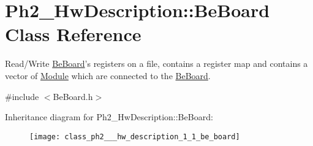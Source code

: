 \hypertarget{class_ph2___hw_description_1_1_be_board}{\section{Ph2\-\_\-\-Hw\-Description\-:\-:Be\-Board Class Reference}
\label{class_ph2___hw_description_1_1_be_board}
}


Read/\-Write \hyperlink{class_ph2___hw_description_1_1_be_board}{Be\-Board}'s registers on a file, contains a register map and contains a vector of \hyperlink{class_ph2___hw_description_1_1_module}{Module} which are connected to the \hyperlink{class_ph2___hw_description_1_1_be_board}{Be\-Board}.  




{\ttfamily \#include $<$Be\-Board.\-h$>$}

Inheritance diagram for Ph2\-\_\-\-Hw\-Description\-:\-:Be\-Board\-:\begin{figure}[H]
\begin{center}
\leavevmode
\texttt{[image: class\_ph2\_\_\_hw\_description\_1\_1\_be\_board]}
\end{center}
\end{figure}
